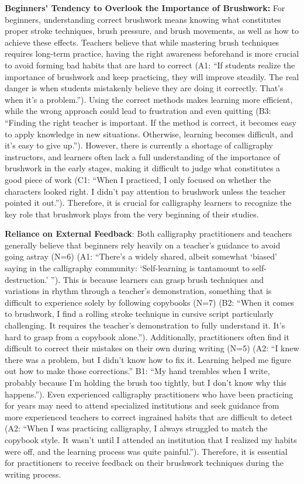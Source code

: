 \textbf{Beginners' Tendency to Overlook the Importance of Brushwork:}
For beginners, understanding correct brushwork means knowing what constitutes proper stroke techniques, brush pressure, and brush movements, as well as how to achieve these effects. Teachers believe that while mastering brush techniques requires long-term practice, having the right awareness beforehand is more crucial to avoid forming bad habits that are hard to correct (A1: ``If students realize the importance of brushwork and keep practicing, they will improve steadily. The real danger is when students mistakenly believe they are doing it correctly. That's when it's a problem.''). Using the correct methods makes learning more efficient, while the wrong approach could lead to frustration and even quitting (B3: ``Finding the right teacher is important. If the method is correct, it becomes easy to apply knowledge in new situations. Otherwise, learning becomes difficult, and it's easy to give up.''). However, there is currently a shortage of calligraphy instructors, and learners often lack a full understanding of the importance of brushwork in the early stages, making it difficult to judge what constitutes a good piece of work (C1: ``When I practiced, I only focused on whether the characters looked right. I didn't pay attention to brushwork unless the teacher pointed it out.''). Therefore, it is crucial for calligraphy learners to recognize the key role that brushwork plays from the very beginning of their studies.

\textbf{Reliance on External Feedback}: Both calligraphy practitioners and teachers generally believe that beginners rely heavily on a teacher's guidance to avoid going astray (N=6) (A1: ``There's a widely shared, albeit somewhat `biased' saying in the calligraphy community: `Self-learning is tantamount to self-destruction.' ''). This is because learners can grasp brush techniques and variations in rhythm through a teacher's demonstration, something that is difficult to experience solely by following copybooks (N=7) (B2: ``When it comes to brushwork, I find a rolling stroke technique in cursive script particularly challenging. It requires the teacher's demonstration to fully understand it. It's hard to grasp from a copybook alone.''). Additionally, practitioners often find it difficult to correct their mistakes on their own during writing (N=5) (A2: ``I knew there was a problem, but I didn't know how to fix it. Learning helped me figure out how to make those corrections.'' B1: ``My hand trembles when I write, probably because I'm holding the brush too tightly, but I don't know why this happens.''). Even experienced calligraphy practitioners who have been practicing for years may need to attend specialized institutions and seek guidance from more experienced teachers to correct ingrained habits that are difficult to detect (A2: ``When I was practicing calligraphy, I always struggled to match the copybook style. It wasn't until I attended an institution that I realized my habits were off, and the learning process was quite painful.''). Therefore, it is essential for practitioners to receive feedback on their brushwork techniques during the writing process. 

